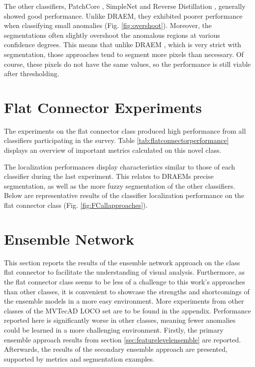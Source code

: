 

The other classifiers, PatchCore \cite{patchCore2022}, SimpleNet \cite{liu2023simplenet} and Reverse Distillation \cite{revdist2023}, generally showed good performance. Unlike DRAEM, they exhibited 
poorer performance when classifying small anomalies (Fig. \ref{fig:overshoot}). Moreover, the segmentations often slightly overshoot the anomalous regions at various confidence 
degrees. This means that unlike DRAEM \cite{Zavrtanik_2021DRAEM}, which is very strict with segmentation, those approaches tend to segment more pixels than necessary. 
Of course, these pixels do not have the same values, so the performance is still viable after thresholding. 





\section{Flat Connector Experiments}
\label{sec:faltconnectorxperiments}

The experiments on the flat connector class produced high performance from all classifiers participating in the survey. Table \ref{tab:flatconnectorperformance} 
displays an overview of important metrics calculated on this novel class.



The localization performances display characteristics similar to those of each classifier during the last experiment. This relates to DRAEMs \cite{Zavrtanik_2021DRAEM} precise segmentation, 
as well as the more fuzzy segmentation of the other classifiers. Below are representative results of the classifier localization performance on the flat connector class (Fig. \ref{fig:FCallapproaches}).






\section{Ensemble Network}
\label{sec:ensembleresults}

This section reports the results of the ensemble network approach on the class flat connector to facilitate the understanding of visual 
analysis. Furthermore, as the flat connector class seems to be less of a challenge to this work's approaches than other classes, it is convenient to showcase the strengths and 
shortcomings of the ensemble models in a more easy environment. More experiments from other classes of the MVTecAD LOCO \cite{LOCODentsAndScratchesBergmann2022} set are to be found in the appendix. 
Performance reported here is significantly worse in other classes, meaning fewer anomalies could be learned in a more challenging environment. Firstly, the primary ensemble approach results from section \ref{sec:featurelevelensemble} are reported. Afterwards, 
the results of the secondary ensemble approach are presented, supported by metrics and segmentation examples.


